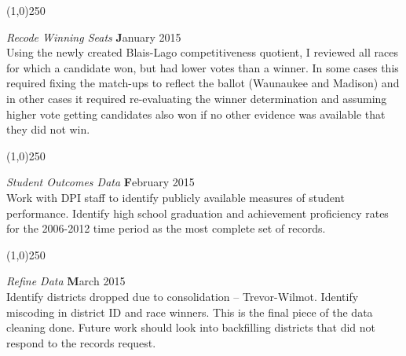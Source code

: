 \begin{center}
\line(1,0){250}
\end{center}

{\em Recode Winning Seats} \hfill {\textbf January 2015}\\

Using the newly created Blais-Lago competitiveness quotient, I reviewed all races 
for which a candidate won, but had lower votes than a winner. In some cases this 
required fixing the match-ups to reflect the ballot (Waunaukee and Madison) and in 
other cases it required re-evaluating the winner determination and assuming higher 
vote getting candidates also won if no other evidence was available that they did 
not win. 

\begin{center}
\line(1,0){250}
\end{center}

{\em Student Outcomes Data} \hfill {\textbf February 2015}\\

Work with DPI staff to identify publicly available measures of student performance. 
Identify high school graduation and achievement proficiency rates for the 
2006-2012 time period as the most complete set of records. 


\begin{center}
\line(1,0){250}
\end{center}

{\em Refine Data} \hfill {\textbf March 2015}\\

Identify districts dropped due to consolidation -- Trevor-Wilmot. Identify 
miscoding in district ID and race winners. This is the final piece of the 
data cleaning done. Future work should look into backfilling districts that 
did not respond to the records request. 


